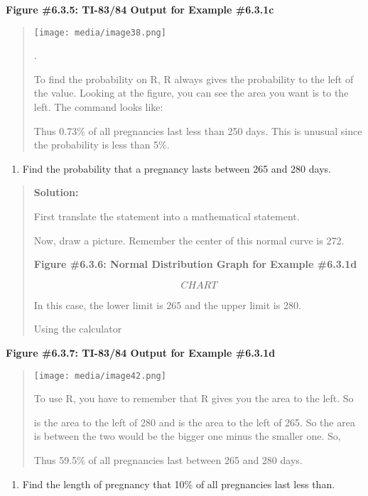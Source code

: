 \documentclass[]{book}
\providecommand{\tightlist}{%
  \setlength{\itemsep}{0pt}\setlength{\parskip}{0pt}}
\begin{document}
\textbf{Figure \#6.3.5: TI-83/84 Output for Example \#6.3.1c}

\begin{quote}
\texttt{[image: media/image38.png]}

.

To find the probability on R, R always gives the probability to the
left of the value. Looking at the figure, you can see the area you
want is to the left. The command looks like:

Thus 0.73\% of all pregnancies last less than 250 days. This is unusual
since the probability is less than 5\%.
\end{quote}

\begin{enumerate}
\def\labelenumi{\alph{enumi}.}
\setcounter{enumi}{3}
\tightlist
\item
  Find the probability that a pregnancy lasts between 265 and 280
  days.
\end{enumerate}

\begin{quote}
\textbf{Solution:}

First translate the statement into a mathematical statement.

Now, draw a picture. Remember the center of this normal curve is 272.

\textbf{Figure \#6.3.6: Normal Distribution Graph for Example \#6.3.1d}

{\[CHART\]}

In this case, the lower limit is 265 and the upper limit is 280.

Using the calculator
\end{quote}

\textbf{Figure \#6.3.7: TI-83/84 Output for Example \#6.3.1d}

\begin{quote}
\texttt{[image: media/image42.png]}

To use R, you have to remember that R gives you the area to the left.
So

is the area to the left of 280 and is the area to the left of 265. So
the area is between the two would be the bigger one minus the smaller
one. So,

Thus 59.5\% of all pregnancies last between 265 and 280 days.
\end{quote}

\begin{enumerate}
\def\labelenumi{\alph{enumi}.}
\setcounter{enumi}{4}
\tightlist
\item
  Find the length of pregnancy that 10\% of all pregnancies last less
  than.
\end{enumerate}
\end{document}
